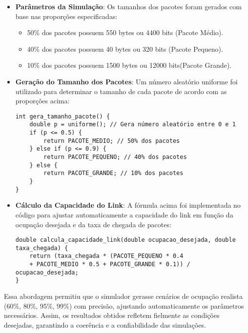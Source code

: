 \begin{itemize}
\item \textbf{Parâmetros da Simulação}: Os tamanhos dos pacotes foram gerados com base nas proporções especificadas:
\begin{itemize}
\item 50\% dos pacotes possuem 550 bytes ou 4400 bits (Pacote Médio).
\item 40\% dos pacotes possuem 40 bytes ou 320 bits (Pacote Pequeno).
\item 10\% dos pacotes possuem 1500 bytes ou 12000 bits(Pacote Grande).
\end{itemize}
\item \textbf{Geração do Tamanho dos Pacotes}: Um número aleatório uniforme foi utilizado para determinar o tamanho de cada pacote de acordo com as proporções acima:
\begin{verbatim}
int gera_tamanho_pacote() {
    double p = uniforme(); // Gera número aleatório entre 0 e 1
    if (p <= 0.5) {
        return PACOTE_MEDIO; // 50% dos pacotes
    } else if (p <= 0.9) {
        return PACOTE_PEQUENO; // 40% dos pacotes
    } else {
        return PACOTE_GRANDE; // 10% dos pacotes
    }
}
\end{verbatim}
\item \textbf{Cálculo da Capacidade do Link}: A fórmula acima foi implementada no código para ajustar automaticamente a capacidade do link em função da ocupação desejada e da taxa de chegada de pacotes:
\begin{verbatim}
double calcula_capacidade_link(double ocupacao_desejada, double taxa_chegada) {
    return (taxa_chegada * (PACOTE_PEQUENO * 0.4
    + PACOTE_MEDIO * 0.5 + PACOTE_GRANDE * 0.1)) / ocupacao_desejada;
}
\end{verbatim}
\end{itemize}

Essa abordagem permitiu que o simulador gerasse cenários de ocupação realista (60\%, 80\%, 95\%, 99\%) com precisão, ajustando automaticamente os parâmetros necessários. Assim, os resultados obtidos refletem fielmente as condições desejadas, garantindo a coerência e a confiabilidade das simulações.
 

